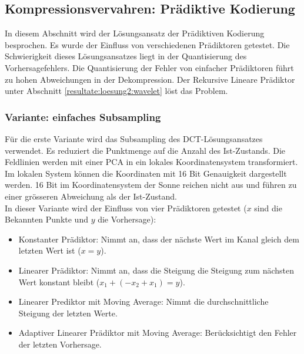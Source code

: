 \subsection{Kompressionsvervahren: Prädiktive Kodierung}  \label{resultate:loesung2}
In diesem Abschnitt wird der Lösungsansatz der Prädiktiven Kodierung besprochen. Es wurde der Einfluss von verschiedenen Prädiktoren getestet. Die Schwierigkeit dieses Lösungsansatzes liegt in der Quantisierung des Vorhersagefehlers. Die Quantisierung der Fehler von einfacher Prädiktoren führt zu hohen Abweichungen in der Dekompression. Der Rekursive Lineare Prädiktor unter Abschnitt \ref{resultate:loesung2:wavelet} löst das Problem.

\subsubsection{Variante: einfaches Subsampling}
Für die erste Variante wird das Subsampling des DCT-Lösungsansatzes verwendet. Es reduziert die Punktmenge auf die Anzahl des Ist-Zustands. Die Feldlinien werden mit einer PCA in ein lokales Koordinatensystem transformiert. Im lokalen System können die Koordinaten mit 16 Bit Genauigkeit dargestellt werden. 16 Bit im Koordinatensystem der Sonne reichen nicht aus und führen zu einer grösseren Abweichung als der Ist-Zustand.\\
In dieser Variante wird der Einfluss von vier Prädiktoren getestet ($x$ sind die Bekannten Punkte und $y$ die Vorhersage):
\begin{itemize}
\item Konstanter Prädiktor: Nimmt an, dass der nächste Wert im Kanal gleich dem  letzten Wert ist ($x = y$).
\item Linearer Prädiktor: Nimmt an, dass die Steigung die Steigung zum nächsten Wert konstant bleibt ($x_1+(-x_2+x_1) = y$).
\item Linearer Prediktor mit Moving Average: Nimmt die durchschnittliche Steigung der letzten Werte.
\item Adaptiver Linearer Prädiktor mit Moving Average: Berücksichtigt den Fehler der letzten Vorhersage.
\end{itemize}

